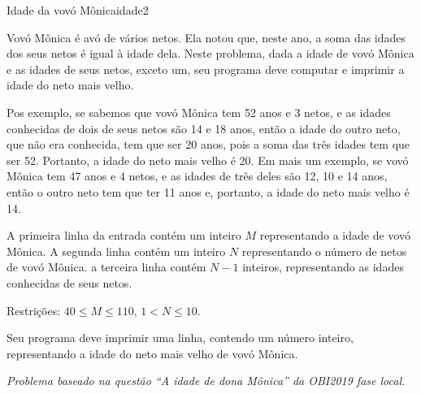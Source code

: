 \documentclass[12pt,a4paper,oneside]{article}
\begin{document}
\begin{problem}{Idade da vovó Mônica}{idade}{2}

Vovó Mônica é avó de vários netos. Ela notou que, neste ano, a soma das idades dos seus netos é igual à idade dela. Neste problema, dada a idade de vovó Mônica e as idades de seus netos, exceto um, seu programa deve computar e imprimir a idade do neto mais velho.

Pos exemplo, se sabemos que vovó Mônica tem 52 anos e 3 netos, e as idades conhecidas de dois de seus netos são 14 e 18 anos, então a idade do outro neto, que não era conhecida, tem que ser 20 anos, pois a soma das três idades tem que ser 52. Portanto, a idade do neto mais velho é 20. Em mais um exemplo, se vovó Mônica tem 47 anos e 4 netos, e as idades de três deles são 12, 10 e 14 anos, então o outro neto tem que ter 11 anos e, portanto, a idade do neto mais velho é 14.

%

\InputFile

A primeira linha da entrada contém um inteiro $M$ representando a idade de vovó Mônica. A segunda linha contém um inteiro $N$ representando o número de netos de vovó Mônica. a terceira linha contém $N-1$ inteiros, representando as idades conhecidas de seus netos.

Restrições: $40 \leq M \leq 110$, $1 < N \leq 10$.

\OutputFile

Seu programa deve imprimir uma linha, contendo um número inteiro, representando a idade do neto mais velho de vovó Mônica.


\Example

\begin{example}
%
\end{example}

\begin{example}
%
\end{example}

\begin{example}
%
\end{example}

\begin{example}
%
\end{example}

\textit{Problema baseado na questão ``A idade de dona Mônica'' da OBI2019 fase local.}

\end{problem}
\end{document}
